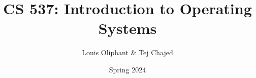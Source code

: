 
\title{CS 537: Introduction to Operating Systems}
\author{Louis Oliphant \& Tej Chajed}
\date{Spring 2024}

\lhead{}
\chead{}
